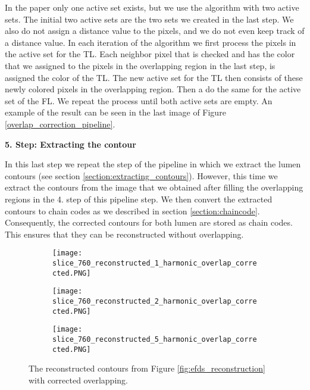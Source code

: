 \documentclass[thesis.tex]{subfiles}
\begin{document}
In the paper only one active set exists, but we use the algorithm with two active sets. The initial two active sets are the two sets we created in the last step. We also do not assign a distance value to the pixels, and we do not even keep track of a distance value. In each iteration of the algorithm we first process the pixels in the active set for the TL. Each neighbor pixel that is checked and has the color that we assigned to the pixels in the overlapping region in the last step, is assigned the color of the TL. The new active set for the TL then consists of these newly colored pixels in the overlapping region. Then a do the same for the active set of the FL. We repeat the process until both active sets are empty. An example of the result can be seen in the last image of Figure \ref{overlap_correction_pipeline}.  

\textbf{5. Step: Extracting the contour}

In this last step we repeat the step of the pipeline in which we extract the lumen contours (see section \ref{section:extracting_contours}). However, this time we extract the contours from the image that we obtained after filling the overlapping regions in the 4. step of this pipeline step. We then convert the extracted contours to chain codes as we described in section \ref{section:chaincode}. Consequently, the corrected contours for both lumen are stored as chain codes. This ensures that they can be reconstructed without overlapping. 

\begin{figure}
	\begin{subfigure}[t]{0.45\textwidth}
		\texttt{[image: slice\_760\_reconstructed\_1\_harmonic\_overlap\_corrected.PNG]}
	\caption{}		
	\end{subfigure}
\hspace{0.05\textwidth}
	\begin{subfigure}[t]{0.45\textwidth}
		\texttt{[image: slice\_760\_reconstructed\_2\_harmonic\_overlap\_corrected.PNG]}		
\caption{}	
	\end{subfigure}
\centering
\begin{subfigure}[t]{0.45\textwidth}
		\texttt{[image: slice\_760\_reconstructed\_5\_harmonic\_overlap\_corrected.PNG]}		
\caption{}	
	\end{subfigure}
	\caption{The reconstructed contours from Figure \ref{fig:efds_reconstruction} with corrected overlapping.}
\label{fig:obliqueslices}
\end{figure}   
\end{document}
